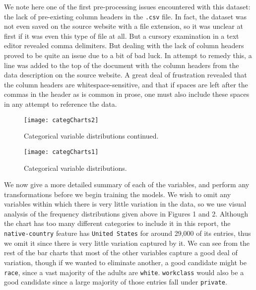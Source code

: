 \documentclass[11pt,oneside,reqno]{amsart}
\theoremstyle{plain}
\theoremstyle{definition}
\theoremstyle{remark}
\newcommand{\inlinecode}{\texttt}
\begin{document}
We note here one of the first pre-processing issues encountered with this dataset: the lack of pre-existing column headers in the \inlinecode{.csv} file. In fact, the dataset was not even saved on the source website with a file extension, so it was unclear at first if it was even this type of file at all. But a cursory examination in a text editor revealed comma delimiters. But dealing with the lack of column headers proved to be quite an issue due to a bit of bad luck. In attempt to remedy this, a line was added to the top of the document with the column headers from the data description on the source website. A great deal of frustration revealed that the column headers are whitespace-sensitive, and that if spaces are left after the commas in the header as is common in prose, one must also include these spaces in any attempt to reference the data. 

\begin{figure}[H]
\begin{adjustbox}{center}
\texttt{[image: categCharts2]}
\end{adjustbox}
\caption{Categorical variable distributions continued.}
\end{figure}

\begin{figure}[H]
\begin{adjustbox}{center}
\texttt{[image: categCharts1]}
\end{adjustbox}
\caption{Categorical variable distributions. }
\end{figure}





We now give a more detailed summary of each of the variables, and perform any transformations before we begin training the models. We wish to omit any variables within which there is very little variation in the data, so we use visual analysis of the frequency distributions given above in Figures 1 and 2. Although the chart has too many different categories to include it in this report, the \inlinecode{native-country} feature has \inlinecode{United States} for around 29,000 of its entries, thus we omit it since there is very little variation captured by it. We can see from the rest of the bar charts that most of the other variables capture a good deal of variation, though if we wanted to eliminate another, a good candidate might be \inlinecode{race}, since a vast majority of the adults are \inlinecode{white}. \inlinecode{workclass} would also be a good candidate since a large majority of those entries fall under \inlinecode{private}. 
\end{document}
